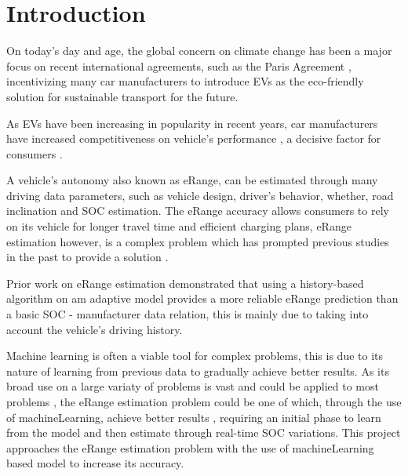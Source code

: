 \chapter{Introduction}
\label{cha:introduction}

On today's day and age, the global concern on climate
change has been a major focus on recent international agreements,
such as the Paris Agreement \citep{parisAgreement},
incentivizing many car manufacturers to introduce
\gls{EVs} as the eco-friendly
solution for sustainable transport for the future.


As \gls{EVs} have been increasing in popularity in
recent years, car manufacturers have
increased competitiveness on vehicle's performance
\citep{evCompetitiveness}, a decisive factor 
for consumers \citep{EGBUE2012717}.


A vehicle's autonomy also known as \gls{eRange},
can be estimated through many driving data parameters,
such as vehicle design, driver's behavior, whether,
road inclination and \gls{SOC} estimation.
The \gls{eRange} accuracy allows consumers to rely
on its vehicle for longer travel time and efficient
charging plans, \gls{eRange} estimation
however, is a complex problem which has prompted
previous studies in the past to provide a solution 
\citep{classicEVX, predictionOfeRange}.

\vbox {
    Prior work \citep{classicEVX} on \gls{eRange}
    estimation demonstrated that using a
    history-based algorithm on am adaptive model
    provides a more reliable \gls{eRange} prediction
    than a basic \gls{SOC} - manufacturer data relation,
    this is mainly due to taking into account the
    vehicle's driving history.
}

Machine learning is often a viable tool for complex
problems, this is due to its nature of 
learning from previous data to 
gradually achieve better results.
As its broad use on a large variaty of problems 
is vast and could be applied to most problems
\citep{mitchelllearning}, the \gls{eRange}
 estimation problem could be one of which, 
through the use of \gls{machineLearning}, 
achieve better results \cite{predictionOfeRange},
requiring an initial phase to learn from 
the model and then estimate through real-time \gls{SOC} variations.
This project approaches the \gls{eRange} estimation
problem with the use of \gls{machineLearning} based
model to increase its accuracy.

